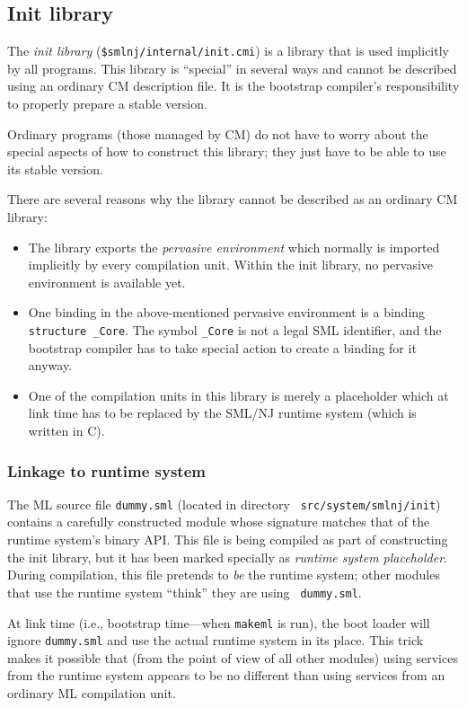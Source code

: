 \subsection{Init library}

The {\em init library} ({\tt \$smlnj/internal/init.cmi}) is a library
that is used implicitly by all programs.  This library is ``special''
in several ways and cannot be described using an ordinary CM
description file.  It is the bootstrap compiler's responsibility to
properly prepare a stable version.

Ordinary programs (those managed by CM) do not have to worry about the
special aspects of how to construct this library; they just have to be
able to use its stable version.

There are several reasons why the library cannot be described as an
ordinary CM library:

\begin{itemize}
\item The library exports the {\em pervasive environment} which
normally is imported implicitly by every compilation unit.  Within the
init library, no pervasive environment is available yet.
\item One binding in the above-mentioned pervasive environment is a
binding {\tt structure \_Core}.  The symbol {\tt \_Core} is not a
legal SML identifier, and the bootstrap compiler has to take special
action to create a binding for it anyway.
\item One of the compilation units in this library is merely a
placeholder which at link time has to be replaced by the SML/NJ
runtime system (which is written in C).
\end{itemize}

\subsubsection{Linkage to runtime system}

The ML source file {\tt dummy.sml} (located in directory {\tt
src/system/smlnj/init}) contains a carefully constructed module whose
signature matches that of the runtime system's binary API.  This file
is being compiled as part of constructing the init library, but it has
been marked specially as {\em runtime system placeholder}.  During
compilation, this file pretends to {\em be} the runtime system; other
modules that use the runtime system ``think'' they are using {\tt
dummy.sml}.

At link time (i.e., bootstrap time---when {\tt makeml} is run), the
boot loader will ignore {\tt dummy.sml} and use the actual runtime
system in its place.  This trick makes it possible that (from the
point of view of all other modules) using services from the runtime
system appears to be no different than using services from an ordinary
ML compilation unit.

